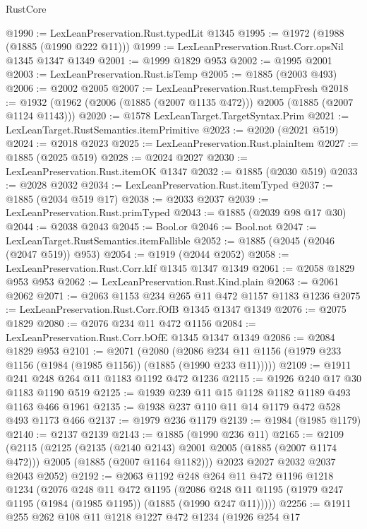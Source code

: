 \begin{lexlean}{RustCore}
\begin{coremodule}
@1990 := LexLeanPreservation.Rust.typedLit @1345
@1995 := @1972 (@1988 (@1885 (@1990 @222 @11)))
@1999 := LexLeanPreservation.Rust.Corr.opsNil @1345 @1347 @1349
@2001 := @1999 @1829 @953
@2002 := @1995 @2001
@2003 := LexLeanPreservation.Rust.isTemp
@2005 := @1885 (@2003 @493)
@2006 := @2002 @2005
@2007 := LexLeanPreservation.Rust.tempFresh
@2018 := @1932 (@1962 (@2006 (@1885 (@2007 @1135 @472))) @2005 (@1885 (@2007 @1124 @1143)))
@2020 := @1578 LexLeanTarget.TargetSyntax.Prim
@2021 := LexLeanTarget.RustSemantics.itemPrimitive
@2023 := @2020 (@2021 @519)
@2024 := @2018 @2023
@2025 := LexLeanPreservation.Rust.plainItem
@2027 := @1885 (@2025 @519)
@2028 := @2024 @2027
@2030 := LexLeanPreservation.Rust.itemOK @1347
@2032 := @1885 (@2030 @519)
@2033 := @2028 @2032
@2034 := LexLeanPreservation.Rust.itemTyped
@2037 := @1885 (@2034 @519 @17)
@2038 := @2033 @2037
@2039 := LexLeanPreservation.Rust.primTyped
@2043 := @1885 (@2039 @98 @17 @30)
@2044 := @2038 @2043
@2045 := Bool.or
@2046 := Bool.not
@2047 := LexLeanTarget.RustSemantics.itemFallible
@2052 := @1885 (@2045 (@2046 (@2047 @519)) @953)
@2054 := @1919 (@2044 @2052)
@2058 := LexLeanPreservation.Rust.Corr.kIf @1345 @1347 @1349
@2061 := @2058 @1829 @953 @953
@2062 := LexLeanPreservation.Rust.Kind.plain
@2063 := @2061 @2062
@2071 := @2063 @1153 @234 @265 @11 @472 @1157 @1183 @1236
@2075 := LexLeanPreservation.Rust.Corr.fOfB @1345 @1347 @1349
@2076 := @2075 @1829
@2080 := @2076 @234 @11 @472 @1156
@2084 := LexLeanPreservation.Rust.Corr.bOfE @1345 @1347 @1349
@2086 := @2084 @1829 @953
@2101 := @2071
    (@2080 (@2086 @234 @11 @1156 (@1979 @233 @1156 (@1984 (@1985 @1156)) (@1885 (@1990 @233 @11)))))
@2109 := @1911 @241 @248 @264 @11 @1183 @1192 @472 @1236
@2115 := @1926 @240 @17 @30 @1183 @1190 @519
@2125 := @1939 @239 @11 @15 @1128 @1182 @1189 @493 @1163 @466 @1961
@2135 := @1938 @237 @110 @11 @14 @1179 @472 @528 @493 @1173 @466
@2137 := @1979 @236 @1179
@2139 := @1984 (@1985 @1179)
@2140 := @2137 @2139
@2143 := @1885 (@1990 @236 @11)
@2165 := @2109
    (@2115
      (@2125
        (@2135 (@2140 @2143) @2001 @2005 (@1885 (@2007 @1174 @472)))
        @2005
        (@1885 (@2007 @1164 @1182)))
      @2023
      @2027
      @2032
      @2037
      @2043
      @2052)
@2192 := @2063
    @1192
    @248
    @264
    @11
    @472
    @1196
    @1218
    @1234
    (@2076
      @248
      @11
      @472
      @1195
      (@2086 @248 @11 @1195 (@1979 @247 @1195 (@1984 (@1985 @1195)) (@1885 (@1990 @247 @11)))))
@2256 := @1911
    @255
    @262
    @108
    @11
    @1218
    @1227
    @472
    @1234
    (@1926
      @254
      @17

\end{coremodule}
\end{lexlean}
